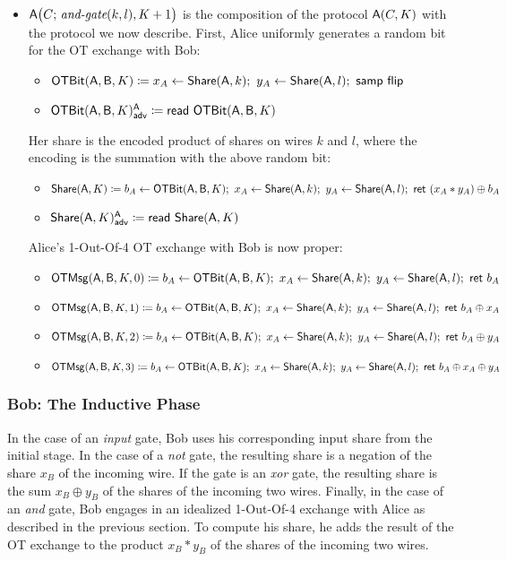 \begin{itemize}
\begin{itemize}
\end{itemize}
\item $\mathsf{A}\big(C; \, \textit{and-gate}(k,l),K+1\big)$ is the composition of the protocol $\mathsf{A}(C,K)$ with the protocol we now describe. First, Alice uniformly generates a random bit for the OT exchange with Bob:
\begin{itemize}
\item $\OTBit(\A,\B,K) \coloneqq x_A \leftarrow \Share(\A,k); \ y_A \leftarrow \Share(\A,l); \ \samp{\flip}$
\item {\color{blue} $\mathsf{OTBit}(\mathsf{A},\mathsf{B},K)^{\mathsf{A}}_{\mathsf{adv}} \coloneqq \mathsf{read} \ \mathsf{OTBit}(\mathsf{A},\mathsf{B},K)$}
\end{itemize}
Her share is the encoded product of shares on wires $k$ and $l$, where the encoding is the summation with the above random bit:
\begin{itemize}
\item $\mathsf{Share}(\mathsf{A},K) \coloneqq b_A \leftarrow \mathsf{OTBit}(\mathsf{A},\mathsf{B},K); \ x_A \leftarrow \mathsf{Share}(\mathsf{A},k); \ y_A \leftarrow \mathsf{Share}(\mathsf{A},l); \ \mathsf{ret} \ (x_A * y_A) \oplus b_A$
\item {\color{blue} $\mathsf{Share}(\mathsf{A},K)^{\mathsf{A}}_{\mathsf{adv}} \coloneqq \mathsf{read} \ \mathsf{Share}(\mathsf{A},K)$}
\end{itemize}
Alice's 1-Out-Of-4 OT exchange with Bob is now proper:
\begin{itemize}
\item $\mathsf{OTMsg}(\mathsf{A},\mathsf{B},K,0) \coloneqq b_A \leftarrow \mathsf{OTBit}(\mathsf{A},\mathsf{B},K); \ x_A \leftarrow \mathsf{Share}(\mathsf{A},k); \ y_A \leftarrow \mathsf{Share}(\mathsf{A},l); \ \mathsf{ret} \ b_A$
\item $\mathsf{OTMsg}(\mathsf{A},\mathsf{B},K,1) \coloneqq b_A \leftarrow \mathsf{OTBit}(\mathsf{A},\mathsf{B},K); \ x_A \leftarrow \mathsf{Share}(\mathsf{A},k); \ y_A \leftarrow \mathsf{Share}(\mathsf{A},l); \ \mathsf{ret} \ b_A \oplus x_A$
\item $\mathsf{OTMsg}(\mathsf{A},\mathsf{B},K,2) \coloneqq b_A \leftarrow \mathsf{OTBit}(\mathsf{A},\mathsf{B},K); \ x_A \leftarrow \mathsf{Share}(\mathsf{A},k); \ y_A \leftarrow \mathsf{Share}(\mathsf{A},l); \ \mathsf{ret} \ b_A \oplus y_A$
\item $\mathsf{OTMsg}(\mathsf{A},\mathsf{B},K,3) \coloneqq b_A \leftarrow \mathsf{OTBit}(\mathsf{A},\mathsf{B},K); \ x_A \leftarrow \mathsf{Share}(\mathsf{A},k); \ y_A \leftarrow \mathsf{Share}(\mathsf{A},l); \ \mathsf{ret} \ b_A \oplus x_A \oplus y_A$
\end{itemize}
\end{itemize}

\subsubsection{Bob: The Inductive Phase}
In the case of an \emph{input} gate, Bob uses his corresponding input share from the initial stage. In the case of a \emph{not} gate, the resulting share is a negation of the share $x_B$ of the incoming wire. If the gate is an \emph{xor} gate, the resulting share is the sum $x_B \oplus y_B$ of the shares of the incoming two wires. Finally, in the case of an \emph{and} gate, Bob engages in an idealized 1-Out-Of-4 exchange with Alice as described in the previous section. To compute his share, he adds the result of the OT exchange to the product $x_B * y_B$ of the shares of the incoming two wires.

